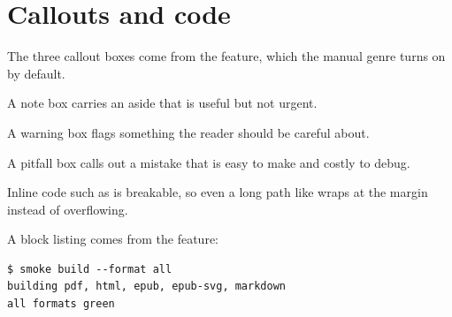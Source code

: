 \chapter{Callouts and code}

The three callout boxes come from the  feature, which the manual
genre turns on by default.

\begin{notebox}
A note box carries an aside that is useful but not urgent.
\end{notebox}

\begin{warnbox}
A warning box flags something the reader should be careful about.
\end{warnbox}

\begin{pitfallbox}
A pitfall box calls out a mistake that is easy to make and costly to debug.
\end{pitfallbox}

Inline code such as  is breakable,
so even a long path like 
wraps at the margin instead of overflowing.

A block listing comes from the  feature:

\begin{lstlisting}[style=shell]
$ smoke build --format all
building pdf, html, epub, epub-svg, markdown
all formats green
\end{lstlisting}
